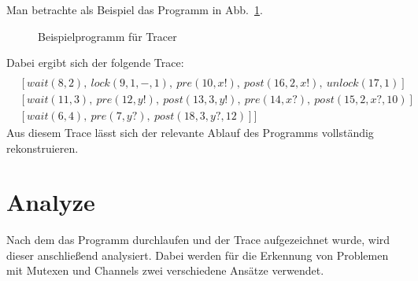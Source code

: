 Man betrachte als Beispiel das Programm in Abb.~\ref{Chap:Tracer-Sec:Trace-Fig:Example}.\\
\begin{figure}[h]
  
  \caption{Beispielprogramm für Tracer}
  \label{Chap:Tracer-Sec:Trace-Fig:Example}
\end{figure}
Dabei ergibt sich der folgende Trace:
\begin{align*}
  [&[signal(1, 2),\ signal(2, 3),\ signal(3, 4),\ pre(4, a?, default),\ post(5, default)]\\
  &[wait(8, 2),\ lock(9, 1, -, 1),\ pre(10, x!),\ post(16, 2, x!),\ unlock(17, 1)]\\
  &[wait(11, 3),\ pre(12, y!),\ post(13, 3, y!),\ pre(14, x?),\ post(15, 2, x?, 10)]\\
  &[wait(6, 4),\ pre(7, y?),\ post(18, 3, y?, 12)]]
\end{align*}
Aus diesem Trace lässt sich der relevante Ablauf des Programms vollständig rekonstruieren.

\section{Analyze}
Nach dem das Programm durchlaufen und der Trace aufgezeichnet wurde, 
wird dieser anschließend analysiert. Dabei werden für die Erkennung von 
Problemen mit Mutexen und Channels zwei verschiedene Ansätze verwendet.

